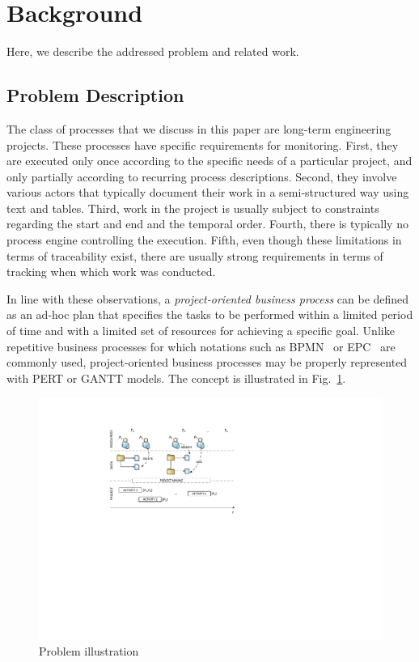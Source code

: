 \section{Background}
\label{sec:bpm2015:background}

Here, we describe the addressed problem and related work.


\subsection{Problem Description}\label{sec:bpm2015:problem}
The class of processes that we discuss in this paper are long-term engineering projects. These processes have specific requirements for monitoring. First, they are executed only once according to the specific needs of a particular project, and only partially according to recurring process descriptions. Second, they involve various actors that typically document their work in a semi-structured way using text and tables. Third, work in the project is usually subject to constraints regarding the start and end and the temporal order. Fourth, there is typically no process engine controlling the execution. Fifth, even though these limitations in terms of traceability exist, there are usually strong requirements in terms of tracking when which work was conducted.


In line with these observations, a \textit{project-oriented business process} can be defined as an ad-hoc plan that specifies the tasks to be performed within a limited period of time and with a limited set of resources for achieving a specific goal. Unlike repetitive business processes for which notations such as BPMN~\cite{bpmn2_stable} or EPC~\cite{vanderaalst_formalization_1999} are commonly used, project-oriented business processes may be properly represented with PERT or GANTT models. The concept is illustrated in Fig.~\ref{fig:problem}.


\begin{figure}[tb]
\centering
\includegraphics[width=.8\textwidth]{bpm2015/imgs/ProjectMining.pdf}
\caption{Problem illustration}
\label{fig:problem}
\end{figure}

